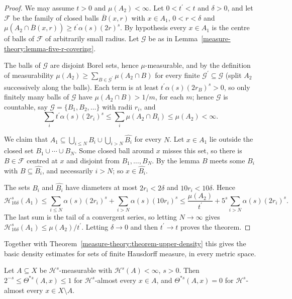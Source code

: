 \begin{proof}
We may assume $t > 0$ and $\mu(A_2) < \infty$. Let $0 < t^{\prime} < t$ and $\delta > 0$, and let $\mathcal{F}$ be the family of closed balls $\overline{B}(x, r)$ with $x \in A_1$, $0 < r < \delta$ and
$\mu(A_2 \cap \overline{B}(x, r)) \geq t^{\prime}\alpha(s)(2r)^s$. By hypothesis every $x \in A_1$ is the centre of balls of $\mathcal{F}$ of arbitrarily small radius. Let $\mathcal{G}$ be as in
Lemma~\ref{measure-theory:lemma-five-r-covering}.

The balls of $\mathcal{G}$ are disjoint Borel sets, hence $\mu$-measurable, and by the definition of measurability $\mu(A_2) \geq \sum_{B \in \mathcal{G}^{\prime}}\mu(A_2 \cap B)$ for every finite
$\mathcal{G}^{\prime} \subseteq \mathcal{G}$ (split $A_2$ successively along the balls). Each term is at least $t^{\prime}\alpha(s)(2r_B)^s > 0$, so only finitely many balls of $\mathcal{G}$ have $\mu(A_2 \cap B) > 1/m$, for each
$m$; hence $\mathcal{G}$ is countable, say $\mathcal{G} = \{B_1, B_2, \ldots\}$ with radii $r_i$, and
\[
\sum_it^{\prime}\alpha(s)(2r_i)^s \leq \sum_i\mu(A_2 \cap B_i) \leq \mu(A_2) < \infty .
\]

We claim that $A_1 \subseteq \bigcup_{i \leq N}B_i \cup \bigcup_{i > N}\widehat{B_i}$ for every $N$. Let $x \in A_1$ lie outside the closed set $B_1 \cup \cdots \cup B_N$. Some closed ball around $x$ misses this set, so
there is $B \in \mathcal{F}$ centred at $x$ and disjoint from $B_1, \ldots, B_N$. By the lemma $B$ meets some $B_i$ with $B \subseteq \widehat{B_i}$, and necessarily $i > N$; so $x \in \widehat{B_i}$.

The sets $B_i$ and $\widehat{B_i}$ have diameters at most $2r_i < 2\delta$ and $10r_i < 10\delta$. Hence
\[
\mathcal{H}^s_{10\delta}(A_1) \leq \sum_{i \leq N}\alpha(s)(2r_i)^s + \sum_{i > N}\alpha(s)(10r_i)^s \leq \frac{\mu(A_2)}{t^{\prime}} + 5^s\sum_{i > N}\alpha(s)(2r_i)^s .
\]
The last sum is the tail of a convergent series, so letting $N \to \infty$ gives $\mathcal{H}^s_{10\delta}(A_1) \leq \mu(A_2)/t^{\prime}$. Letting $\delta \to 0$ and then $t^{\prime} \to t$ proves the theorem.
\end{proof}

Together with Theorem~\ref{measure-theory:theorem-upper-density} this gives the basic density estimates for sets of finite Hausdorff measure, in every metric space.

\begin{theorem}\label{measure-theory:theorem-density-bounds}
Let $A \subseteq X$ be $\mathcal{H}^s$-measurable with $\mathcal{H}^s(A) < \infty$, $s > 0$. Then $2^{-s} \leq \Theta^{*s}(A, x) \leq 1$ for $\mathcal{H}^s$-almost every $x \in A$, and $\Theta^{*s}(A, x) = 0$ for
$\mathcal{H}^s$-almost every $x \in X \setminus A$.
\end{theorem}

